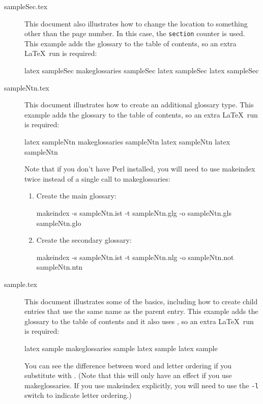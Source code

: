 \documentclass{nlctdoc}
\begin{document}
\begin{description}
\item[sampleSec.tex]\label{ex:sampleSec} This document also
illustrates how to change the location to something other than the
page number. In this case, the \texttt{section} counter is used.
This example adds the glossary to the table of contents, so an extra
\LaTeX\ run is required:
\begin{prompt}
latex sampleSec
makeglossaries sampleSec
latex sampleSec
latex sampleSec
\end{prompt}

\item[sampleNtn.tex]\label{ex:sampleNtn} This document illustrates
how to create an additional glossary type. This example adds the
glossary to the table of contents, so an extra \LaTeX\ run is
required:
\begin{prompt}
latex sampleNtn
makeglossaries sampleNtn
latex sampleNtn
latex sampleNtn
\end{prompt}
Note that if you don't have Perl installed, you will need to use
\gls{makeindex} twice instead of a single call to
\gls{makeglossaries}:
\begin{enumerate}
\item Create the main glossary:
\begin{prompt}
makeindex -s sampleNtn.ist -t sampleNtn.glg -o sampleNtn.gls sampleNtn.glo
\end{prompt}
\item Create the secondary glossary:
\begin{prompt}
makeindex -s sampleNtn.ist -t sampleNtn.nlg -o sampleNtn.not sampleNtn.ntn
\end{prompt}
\end{enumerate}

\item[sample.tex]\label{ex:sample} This document illustrates some of
the basics, including how to create child entries that use the same
name as the parent entry. This example adds the glossary to the
table of contents and it also uses , so an extra \LaTeX\ 
run is required:
\begin{prompt}
latex sample
makeglossaries sample
latex sample
latex sample
\end{prompt}
You can see the difference between word and letter ordering if you
substitute \pkgopt[word]{order} with \pkgopt[letter]{order}. (Note
that this will only have an effect if you use
\gls{makeglossaries}. If you use \gls{makeindex} explicitly,
you will need to use the \texttt{-l} switch to indicate letter
ordering.)


\end{description}
\end{document}
